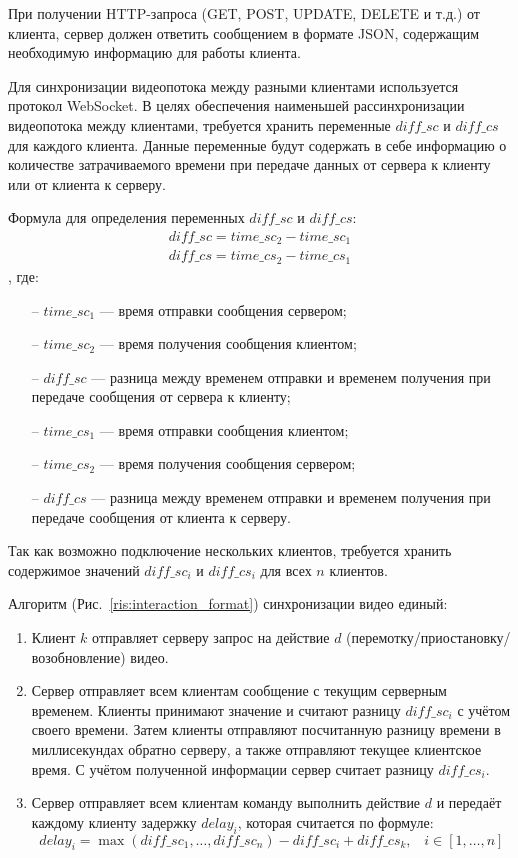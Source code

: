 При получении HTTP-запроса (GET, POST, UPDATE, DELETE и т.д.) от клиента, сервер должен ответить сообщением в формате
JSON, содержащим необходимую информацию для работы клиента.

Для синхронизации видеопотока между разными клиентами используется протокол WebSocket.
В целях обеспечения наименьшей рассинхронизации видеопотока между клиентами, требуется хранить переменные \(diff\_sc\) и \(diff\_cs\) для
каждого клиента.
Данные переменные будут содержать в себе информацию о количестве затрачиваемого времени при передаче данных от сервера к клиенту или от клиента к серверу.

Формула для определения переменных \(diff\_sc\) и \(diff\_cs\): \begin{gather*}
                                                                    diff\_sc = time\_sc_2 - time\_sc_1\\
                                                                    diff\_cs = time\_cs_2 - time\_cs_1
\end{gather*}, где:
\begin{itemize}[noitemsep]
    \item[--] \(time\_sc_1\) — время отправки сообщения сервером;
    \item[--] \(time\_sc_2\) — время получения сообщения клиентом;
    \item[--] \(diff\_sc\) — разница между временем отправки и временем получения при передаче сообщения от сервера к клиенту;
    \item[--] \(time\_cs_1\) — время отправки сообщения клиентом;
    \item[--] \(time\_cs_2\) — время получения сообщения сервером;
    \item[--] \(diff\_cs\) — разница между временем отправки и временем получения при передаче сообщения от клиента к серверу.
\end{itemize}

Так как возможно подключение нескольких клиентов, требуется хранить содержимое значений \(diff\_sc_i\) и \(diff\_cs_i\) для всех \(n\) клиентов.

Алгоритм (Рис.~\ref{ris:interaction_format}) синхронизации видео единый:
\begin{enumerate}
    \item Клиент \(k\) отправляет серверу запрос на действие \(d\) (перемотку/приостановку/возобновление) видео.
    \item Сервер отправляет всем клиентам сообщение с текущим серверным временем.
    Клиенты принимают значение и считают разницу \(diff\_sc_i\) с учётом своего времени.
    Затем клиенты отправляют посчитанную разницу времени в миллисекундах обратно серверу, а также отправляют текущее клиентское время.
    С учётом полученной информации сервер считает разницу \(diff\_cs_i\).
    \item Сервер отправляет всем клиентам команду выполнить действие \(d\) и передаёт каждому клиенту задержку \(delay_i\),
    которая считается по формуле: \[ delay_i = \max(diff\_sc_1, \ldots, diff\_sc_n) - diff\_sc_i + diff\_cs_k, \;\;\; i \in [1, \ldots, n] \]
\end{enumerate}

